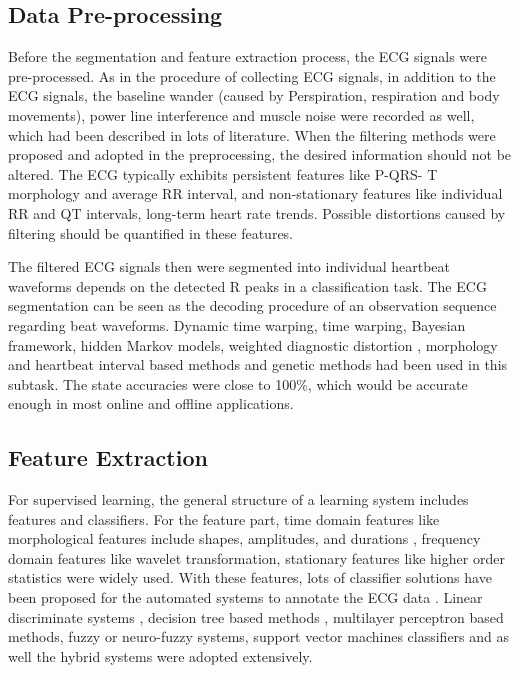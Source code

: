 \documentclass{bmcart}
\begin{document}
\subsection*{Data Pre-processing}
Before the segmentation and feature extraction process, the ECG signals were pre-processed. As in the procedure of collecting ECG signals, in addition to the ECG signals, the baseline wander (caused by Perspiration, respiration and body movements), power line interference and muscle noise were recorded as well, which had been described in lots of literature\cite{blanco2008ecg}. When the filtering methods were proposed and adopted in the preprocessing, the desired information should not be altered. The ECG typically exhibits persistent features like P-QRS- T morphology and average RR interval, and non-stationary features like individual RR and QT intervals, long-term heart rate trends\cite{clifford}. Possible distortions caused by filtering should be quantified in these features.

The filtered ECG signals then were segmented into individual heartbeat waveforms depends on the detected R peaks in a classification task. The ECG segmentation can be seen as the decoding procedure of an observation sequence regarding beat waveforms\cite{andreao2006ecg}. Dynamic time warping\cite{vullings1998automated}, time warping\cite{vullings1997ecg}, Bayesian framework\cite{sayadi2009model}, hidden Markov models\cite{andreao2006ecg}, weighted diagnostic distortion \cite{zigel2000weighted}, morphology and heartbeat interval based methods\cite{de2004automatic} and genetic methods\cite{gacek2003genetic} had been used in this subtask. The state accuracies were close to 100\%, which would be accurate enough in most online and offline applications.



\subsection*{Feature Extraction}
For supervised learning, the general structure of a learning system includes features and classifiers. For the feature part, time domain features like morphological features include shapes, amplitudes, and durations \cite{jekova, christove, can}, frequency domain features like wavelet transformation\cite{inan}, \cite{banerjee} stationary features like higher order statistics were widely used. With these features, lots of classifier solutions have been proposed for the automated systems to annotate the ECG data \cite{osowski, vullings1998automated, sayadi2009model}. Linear discriminate systems \cite{shinwari2012classification}, decision tree based methods \cite{krasteva2014classification, charfi2012comparative}, multilayer perceptron based methods, fuzzy or neuro-fuzzy systems\cite{erhan2009difficulty,vafaie2014heart }, support vector machines classifiers\cite{ubeyli2007ecg} and as well the hybrid systems\cite{homaeinezhad2012ecg, vanitha2013hybrid} were adopted extensively.
\end{document}
